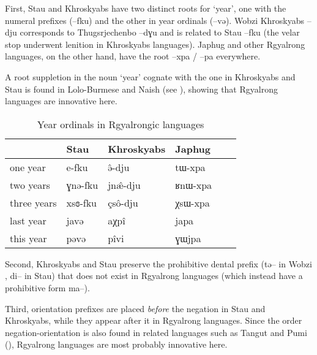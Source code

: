 \documentclass[oneside,a4paper,11pt]{article}
\newcommand{\ipa}[1]{{\phon #1}} %
\begin{document}
First, Stau and Khroskyabs have two distinct roots for `year', one with the numeral prefixes (\ipa{--fku}) and the other in year ordinals (\ipa{--və}). Wobzi Khroskyabs \ipa{--dju} corresponds to Thugsrjechenbo \ipa{--dɣu} and is related to Stau \ipa{--fku} (the velar stop underwent lenition in Khroskyabs languages). Japhug and other Rgyalrong languages, on the other hand, have the root \ipa{--xpa} / \ipa{--pa} everywhere. 

A root suppletion in the noun `year' cognate with the one in Khroskyabs and Stau is found in Lolo-Burmese and Naish (see \citealt{jacques.michaud11naish}), showing that Rgyalrong languages are innovative here.

  \begin{table}[h]
  \caption{Year ordinals in Rgyalrongic languages} \label{tab:year} \centering
 \begin{tabular}{llllll}
 \toprule
 & 	Stau & 	Khroskyabs & 	Japhug & 	\\	
 \midrule
one year & 	\ipa{e-fku} & 	\ipa{ə̂-dju } & 	\ipa{tɯ-xpa} & 	\\	
two years & 	\ipa{ɣnə-fku} & 	\ipa{jnæ̂-dju } & 	\ipa{ʁnɯ-xpa} & 	\\	
three years & 	\ipa{xsɞ-fku} & 	\ipa{çsô-dju } & 	\ipa{χsɯ-xpa} & 	\\	
 \midrule
last year & 	\ipa{javə} & 	\ipa{aχpî} & 	\ipa{japa} & 	\\	
this year & 	\ipa{pəvə} & 	\ipa{pîvi} & 	\ipa{ɣɯjpa} & 	\\	
\bottomrule
\end{tabular}
\end{table}


Second, Khroskyabs and Stau preserve the prohibitive dental prefix (\ipa{tə--} in Wobzi \citealt[130-1]{lai13affixale}, \ipa{di--} in Stau) that does not exist in Rgyalrong languages (which instead have a prohibitive form \ipa{ma--}).

Third, orientation prefixes are placed \textit{before} the negation in Stau and Khroskyabs, while they appear after it in Rgyalrong languages. Since the order negation-orientation is also found in related languages such as Tangut and Pumi (\citealt{jacques11tangut.verb}), Rgyalrong languages are most probably innovative here.



\end{document}
